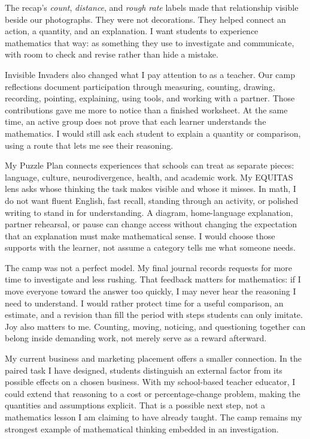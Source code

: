 The recap's \textit{count}, \textit{distance}, and \textit{rough rate} labels made that relationship visible beside our photographs. They were not decorations. They helped connect an action, a quantity, and an explanation. I want students to experience mathematics that way: as something they use to investigate and communicate, with room to check and revise rather than hide a mistake.

\newpage
{}

Invisible Invaders also changed what I pay attention to as a teacher. Our camp reflections document participation through measuring, counting, drawing, recording, pointing, explaining, using tools, and working with a partner. Those contributions gave me more to notice than a finished worksheet. At the same time, an active group does not prove that each learner understands the mathematics. I would still ask each student to explain a quantity or comparison, using a route that lets me see their reasoning.

My Puzzle Plan connects experiences that schools can treat as separate pieces: language, culture, neurodivergence, health, and academic work. My EQUITAS lens asks whose thinking the task makes visible and whose it misses. In math, I do not want fluent English, fast recall, standing through an activity, or polished writing to stand in for understanding. A diagram, home-language explanation, partner rehearsal, or pause can change access without changing the expectation that an explanation must make mathematical sense. I would choose those supports with the learner, not assume a category tells me what someone needs.

The camp was not a perfect model. My final journal records requests for more time to investigate and less rushing. That feedback matters for mathematics: if I move everyone toward the answer too quickly, I may never hear the reasoning I need to understand. I would rather protect time for a useful comparison, an estimate, and a revision than fill the period with steps students can only imitate. Joy also matters to me. Counting, moving, noticing, and questioning together can belong inside demanding work, not merely serve as a reward afterward.

My current business and marketing placement offers a smaller connection. In the paired task I have designed, students distinguish an external factor from its possible effects on a chosen business. With my school-based teacher educator, I could extend that reasoning to a cost or percentage-change problem, making the quantities and assumptions explicit. That is a possible next step, not a mathematics lesson I am claiming to have already taught. The camp remains my strongest example of mathematical thinking embedded in an investigation.

